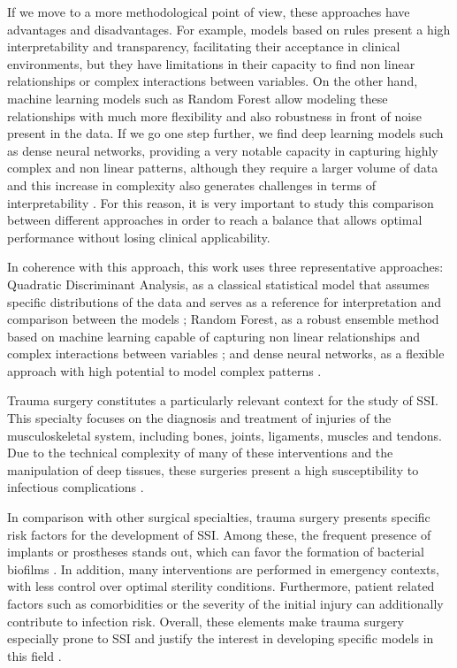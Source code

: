 \documentclass[12pt,onecolumn]{article}
\begin{document}
If we move to a more methodological point of view, these approaches have advantages and disadvantages. For example, models based on rules present a high interpretability and transparency, facilitating their acceptance in clinical environments, but they have limitations in their capacity to find non linear relationships or complex interactions between variables\cite{20_rule_based_models}. On the other hand, machine learning models such as Random Forest allow modeling these relationships with much more flexibility and also robustness in front of noise present in the data\cite{12_machine_learning_SSI_prediction,15_intro_machine_learning}. If we go one step further, we find deep learning models such as dense neural networks, providing a very notable capacity in capturing highly complex and non linear patterns, although they require a larger volume of data and this increase in complexity also generates challenges in terms of interpretability \cite{intro_deep_neural_networks}. For this reason, it is very important to study this comparison between different approaches in order to reach a balance that allows optimal performance without losing clinical applicability\cite{16_ai_models_review, 20_rule_based_models}.

In coherence with this approach, this work uses three representative approaches: Quadratic Discriminant Analysis, as a classical statistical model that assumes specific distributions of the data and serves as a reference for interpretation and comparison between the models \cite{intro_Quadratic_Discriminant_Analysis}; Random Forest, as a robust ensemble method based on machine learning capable of capturing non linear relationships and complex interactions between variables \cite{intro_random_forest}; and dense neural networks, as a flexible approach with high potential to model complex patterns \cite{intro_dense_neural_networks}.

Trauma surgery constitutes a particularly relevant context for the study of SSI. This specialty focuses on the diagnosis and treatment of injuries of the musculoskeletal system, including bones, joints, ligaments, muscles and tendons. Due to the technical complexity of many of these interventions and the manipulation of deep tissues, these surgeries present a high susceptibility to infectious complications \cite{intro_epidemiology_fractures}.

In comparison with other surgical specialties, trauma surgery presents specific risk factors for the development of SSI. Among these, the frequent presence of implants or prostheses stands out, which can favor the formation of bacterial biofilms \cite{intro_implant_infections}. In addition, many interventions are performed in emergency contexts, with less control over optimal sterility conditions. Furthermore, patient related factors such as comorbidities or the severity of the initial injury can additionally contribute to infection risk. Overall, these elements make trauma surgery especially prone to SSI and justify the interest in developing specific models in this field \cite{intro_ssi_costs_orthotrauma,intro_ssi_risk_factors}.
\end{document}
